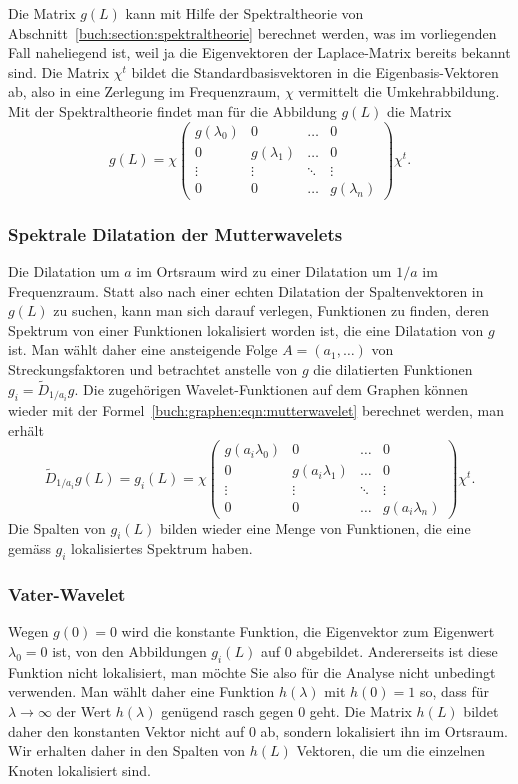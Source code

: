 Die Matrix $g(L)$ kann mit Hilfe der Spektraltheorie
von Abschnitt~\ref{buch:section:spektraltheorie}
berechnet werden,
was im vorliegenden Fall naheliegend ist, weil ja die Eigenvektoren 
der Laplace-Matrix bereits bekannt sind.
Die Matrix $\chi^t$ bildet die Standardbasisvektoren in die
Eigenbasis-Vektoren ab, also in eine Zerlegung im Frequenzraum,
$\chi$ vermittelt die Umkehrabbildung.
Mit der Spektraltheorie findet man für die Abbildung $g(L)$ die Matrix
\begin{equation}
g(L)
=
\chi
\begin{pmatrix}
g(\lambda_0)&0&\dots&0\\
0&g(\lambda_1)&\dots&0\\
\vdots&\vdots&\ddots&\vdots\\
0&0&\dots&g(\lambda_n)
\end{pmatrix}
\chi^t.
\label{buch:graphen:eqn:mutterwavelet}
\end{equation}

\subsubsection{Spektrale Dilatation der Mutterwavelets}
Die Dilatation um $a$ im Ortsraum wird zu einer Dilatation um $1/a$ im
Frequenzraum.
Statt also nach einer echten Dilatation der Spaltenvektoren in $g(L)$
zu suchen, kann man sich darauf verlegen, Funktionen zu finden, deren
Spektrum von einer Funktionen lokalisiert worden ist, die eine Dilatation
von $g$ ist.
Man wählt daher eine ansteigende Folge $A=(a_1,\dots)$ von Streckungsfaktoren
und betrachtet anstelle von $g$ die dilatierten Funktionen
$g_i=\tilde{D}_{1/a_i}g$.
Die zugehörigen Wavelet-Funktionen auf dem Graphen können wieder mit
der Formel~\eqref{buch:graphen:eqn:mutterwavelet} berechnet werden,
man erhält
\begin{equation}
\tilde{D}_{1/a_i}g(L)
=
g_i(L)
=
\chi
\begin{pmatrix}
g(a_i\lambda_0)&0&\dots&0\\
0&g(a_i\lambda_1)&\dots&0\\
\vdots&\vdots&\ddots&\vdots\\
0&0&\dots&g(a_i\lambda_n)
\end{pmatrix}
\chi^t .
\end{equation}
Die Spalten von $g_i(L)$ bilden wieder eine Menge von Funktionen, die
eine gemäss $g_i$ lokalisiertes Spektrum haben.

\subsubsection{Vater-Wavelet}
Wegen $g(0)=0$ wird die konstante Funktion, die Eigenvektor zum Eigenwert
$\lambda_0=0$ ist, von den Abbildungen $g_i(L)$ auf $0$ abgebildet.
Andererseits ist diese Funktion nicht lokalisiert, man möchte Sie also
für die Analyse nicht unbedingt verwenden.
Man wählt daher eine Funktion $h(\lambda)$ mit $h(0)=1$ so, dass
für $\lambda\to \infty$ der Wert $h(\lambda)$ genügend rasch gegen $0$
geht.
Die Matrix $h(L)$ bildet daher den konstanten Vektor nicht auf $0$ ab,
sondern lokalisiert ihn im Ortsraum.
Wir erhalten daher in den Spalten von $h(L)$ Vektoren, die um die
einzelnen Knoten lokalisiert sind.

